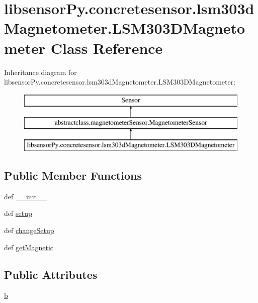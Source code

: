 \hypertarget{classlibsensorPy_1_1concretesensor_1_1lsm303dMagnetometer_1_1LSM303DMagnetometer}{}\section{libsensor\+Py.\+concretesensor.\+lsm303d\+Magnetometer.\+L\+S\+M303\+D\+Magnetometer Class Reference}
\label{classlibsensorPy_1_1concretesensor_1_1lsm303dMagnetometer_1_1LSM303DMagnetometer}
Inheritance diagram for libsensor\+Py.\+concretesensor.\+lsm303d\+Magnetometer.\+L\+S\+M303\+D\+Magnetometer\+:\begin{figure}[H]
\begin{center}
\leavevmode
\includegraphics[height=3.000000cm]{classlibsensorPy_1_1concretesensor_1_1lsm303dMagnetometer_1_1LSM303DMagnetometer}
\end{center}
\end{figure}
\subsection*{Public Member Functions}
\begin{DoxyCompactItemize}
\item 
def \hyperlink{classlibsensorPy_1_1concretesensor_1_1lsm303dMagnetometer_1_1LSM303DMagnetometer_a4567f16e85ce3b284e30101c88520dee}{\+\_\+\+\_\+init\+\_\+\+\_\+}
\item 
def \hyperlink{classlibsensorPy_1_1concretesensor_1_1lsm303dMagnetometer_1_1LSM303DMagnetometer_a201cdedf8ecc89f24989e03d5ec375d1}{setup}
\item 
def \hyperlink{classlibsensorPy_1_1concretesensor_1_1lsm303dMagnetometer_1_1LSM303DMagnetometer_a430173e0dd6ac79189169a111d36297c}{change\+Setup}
\item 
def \hyperlink{classlibsensorPy_1_1concretesensor_1_1lsm303dMagnetometer_1_1LSM303DMagnetometer_a883686ad4d2c573fb596e27339117915}{get\+Magnetic}
\end{DoxyCompactItemize}
\subsection*{Public Attributes}
\begin{DoxyCompactItemize}
\item 
\hyperlink{classlibsensorPy_1_1concretesensor_1_1lsm303dMagnetometer_1_1LSM303DMagnetometer_ac4f7ce39fa5dbc717744ff41f4259e03}{b}
\end{DoxyCompactItemize}
